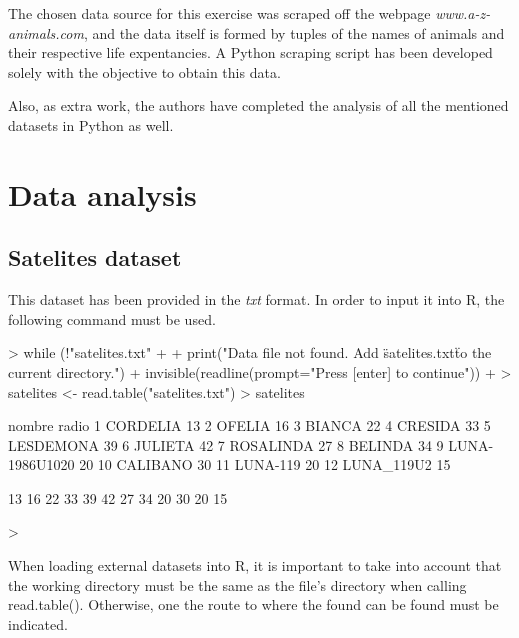 \documentclass[a4paper]{article}
\begin{document}
The chosen data source for this exercise was scraped off the webpage
\textit{www.a-z-animals.com}, and the data itself is formed by tuples of the
names of animals and their respective life expentancies. A Python scraping
script has been developed solely with the objective to obtain this data.

Also, as extra work, the authors have completed the analysis of all the
mentioned datasets in Python as well.


\section*{Data analysis}


\subsection*{Satelites dataset}

This dataset has been provided in the \textit{txt} format. In order to input it
into R, the following command must be used.

\begin{Schunk}
\begin{Sinput}
> while (!"satelites.txt" %in% list.files(getwd()))
+ {
+ print("Data file not found. Add \"satelites.txt\" to the current directory.")
+ invisible(readline(prompt="Press [enter] to continue"))
+ }
> satelites <- read.table("satelites.txt")
> satelites
\end{Sinput}
\begin{Soutput}
           nombre radio
1        CORDELIA    13
2          OFELIA    16
3          BIANCA    22
4         CRESIDA    33
5       LESDEMONA    39
6         JULIETA    42
7       ROSALINDA    27
8         BELINDA    34
9  LUNA-1986U1020    20
10       CALIBANO    30
11       LUNA-119    20
12     LUNA_119U2    15
\end{Soutput}
\begin{Soutput}
 [1] 13 16 22 33 39 42 27 34 20 30 20 15
\end{Soutput}
\begin{Sinput}
> 
\end{Sinput}
\end{Schunk}
When loading external datasets into R, it is important to take into account that
the working directory must be the same as the file's directory when calling
read.table(). Otherwise, one the route to where the found can be found must be
indicated.
\end{document}
